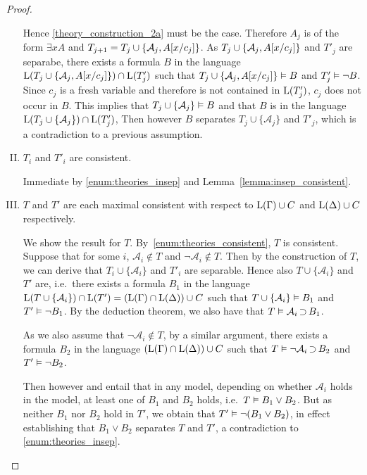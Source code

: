 \begin{proof}
\begin{enumerate}[I.]
			Hence \ref{theory_construction_2a} must be the case. Therefore $A_j$ is of the form $\exists x A$ and $T_{j+1} = T_{j} \cup \{ \mathcal{A}_{j}, A[x/c_j] \}$.
			As $T_{j} \cup \{ \mathcal{A}_{j}, A[x/c_j]  \}$ and $T'_j$ are separabe, there exists a formula $B$ in the language $\operatorname{L}(T_{j} \cup \{ \mathcal{A}_{j}, A[x/c_j]  \}) \cap \operatorname{L}(T'_j)$
			such that $ T_{j} \cup \{ \mathcal{A}_{j}, A[x/c_j] \} \vDash B$ and $T'_j \vDash \lnot B$.
			Since $c_j$ is a fresh variable and therefore is not contained in $\operatorname{L}(T'_j)$, $c_j$ does not occur in $B$.
			This implies that $T_j \cup \{\mathcal{A}_j\} \vDash B$ and
			that $B$ is in the language $\operatorname{L}(T_{j} \cup \{ \mathcal{A}_{j}\}) \cap \operatorname{L}(T'_j)$,
			Then however $B$ separates $T_{j} \cup \{ \mathcal{A}_{j} \}$ and $T'_{j}$, which is a contradiction to a previous assumption. 



			\item 
			\label{enum:theories_consistent}
			$T_i$ and $T'_i$ are consistent.

			Immediate by \ref{enum:theories_insep} and Lemma~\ref{lemma:insep_consistent}.

		\item
			\label{enum:each_max_consistent}
			$T$ and $T'$ are each maximal consistent with respect to $\operatorname{L}(\Gamma) \cup C$ and $\operatorname{L}(\Delta) \cup C$ respectively.

			We show the result for $T$.
			By~\ref{enum:theories_consistent}, $T$ is consistent.
			Suppose that for some $i$, $\mathcal{A}_i \not\in T$ and $\lnot\mathcal{A}_i \not\in T$.
			Then by the construction of $T$, we can derive that
			$T_i \cup \{\mathcal{A}_i\}$ and $T'_i$ are separable.
			Hence also
			$T \cup \{\mathcal{A}_i\}$ and $T'$ are, i.e.\ there exists a formula $B_1$ in the language $\operatorname{L}(T\cup\{\mathcal{A}_i\}) \cap \operatorname{L}(T') = (\operatorname{L}(\Gamma) \cap \operatorname{L}(\Delta)) \cup C$ such that
			$T \cup \{\mathcal{A}_i\} \vDash B_1$ and $T' \vDash \lnot B_1$.
			By the deduction theorem, we also have that \markA{} $T \vDash \mathcal{A}_i \operatorname{\supset} B_1$.

			As we also assume that $\lnot \mathcal{A}_i \not\in T$, by a similar argument, there exists a formula $B_2$ in the language  $(\operatorname{L}(\Gamma) \cap \operatorname{L}(\Delta)) \cup C$ such that 
			\markB{} $T \vDash \lnot \mathcal{A}_i \operatorname{\supset} B_2$ and $T' \vDash \lnot B_2$.

			Then however \markA{} and \markB{} entail that in any model, depending on whether $\mathcal{A}_i$ holds in the model, at least one of $B_1$ and $B_2$ holds, i.e.\ $T \vDash B_1 \lor B_2$.
			But as neither $B_1$ nor $B_2$ hold in $T'$, we obtain that $T' \vDash \lnot (B_1 \lor B_2)$, in effect establishing that $B_1 \lor B_2$ separates $T$ and $T'$, a contradiction to \ref{enum:theories_insep}.



\end{enumerate}
\end{proof}

